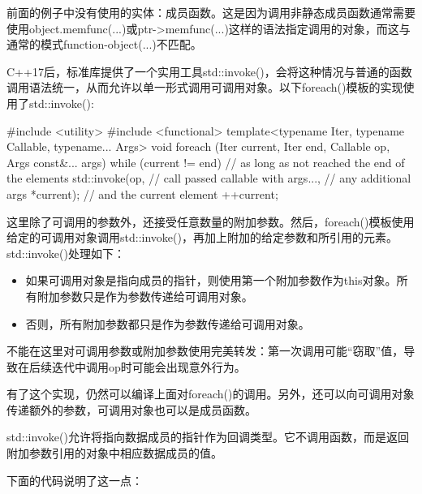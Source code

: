 前面的例子中没有使用的实体：成员函数。这是因为调用非静态成员函数通常需要使用object.memfunc(...)或ptr->memfunc(...)这样的语法指定调用的对象，而这与通常的模式function-object(...)不匹配。

C++17后，标准库提供了一个实用工具std::invoke()，会将这种情况与普通的函数调用语法统一，从而允许以单一形式调用可调用对象。以下foreach()模板的实现使用了std::invoke():

\begin{cpp}
#include <utility>
#include <functional>
template<typename Iter, typename Callable, typename... Args>
void foreach (Iter current, Iter end, Callable op, Args const&... args) {
	while (current != end) { // as long as not reached the end of the elements
		std::invoke(op, // call passed callable with
					args..., // any additional args
					*current); // and the current element
		++current;
	}
}
\end{cpp}

这里除了可调用的参数外，还接受任意数量的附加参数。然后，foreach()模板使用给定的可调用对象调用std::invoke()，再加上附加的给定参数和所引用的元素。std::invoke()处理如下：

\begin{itemize}
\item
如果可调用对象是指向成员的指针，则使用第一个附加参数作为this对象。所有附加参数只是作为参数传递给可调用对象。

\item
否则，所有附加参数都只是作为参数传递给可调用对象。
\end{itemize}

不能在这里对可调用参数或附加参数使用完美转发：第一次调用可能“窃取”值，导致在后续迭代中调用op时可能会出现意外行为。

有了这个实现，仍然可以编译上面对foreach()的调用。另外，还可以向可调用对象传递额外的参数，可调用对象也可以是成员函数。

\begin{notice}
std::invoke()允许将指向数据成员的指针作为回调类型。它不调用函数，而是返回附加参数引用的对象中相应数据成员的值。
\end{notice}

下面的代码说明了这一点：

